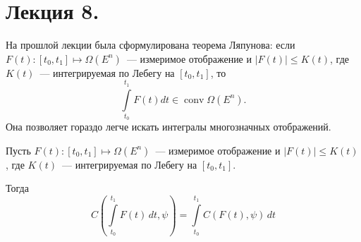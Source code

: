 \section{Лекция 8.}

На прошлой лекции была сформулирована теорема Ляпунова:
если $F(t)\colon [t_0, t_1] \mapsto \Omega(E^n)$~--- измеримое отображение и 
$|F(t)| \leqslant K(t)$, где $K(t)$~--- интегрируемая по Лебегу на $[t_0, t_1]$, то
\begin{equation*}
    \int\limits_{t_0}^{t_1} F(t) dt \in \operatorname{conv} \Omega(E^n).
\end{equation*}
Она позволяет гораздо легче искать интегралы многозначных отображений.

\begin{lem}
    Пусть $F(t)\colon [t_0, t_1] \mapsto \Omega(E^n)$~--- измеримое отображение и
    $|F(t)| \leqslant K(t)$, где $K(t)$~--- интегрируемая по Лебегу на $[t_0, t_1]$.

    Тогда
    \begin{equation*}
        C\left( \int\limits_{t_0}^{t_1} F(t) \, dt, \psi \right) = 
        \int\limits_{t_0}^{t_1} C(F(t), \psi) \, dt 
    \end{equation*}
\end{lem}
